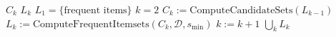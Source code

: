 \begin{algorithmic}[1]
        \State $C_k$ 
        \State $L_k$ 
        \State $L_1=\{\text{frequent items}\}$
        \State $k=2$
            \State $C_{k}:=\mathrm{ComputeCandidateSets}(L_{k-1})$
            \State $L_{k}:=\mathrm{ComputeFrequentItemsets}(C_k, \mathcal{D}, s_{\mathrm{min}})$
           	\State $k:=k+1$
        \EndWhile
        \State \Return $\bigcup_k L_k$
    \EndFunction
\end{algorithmic}